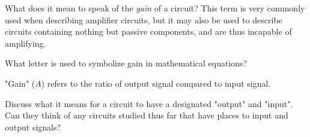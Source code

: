 

What does it mean to speak of the {\it gain} of a circuit?  This term is very commonly used when describing amplifier circuits, but it may also be used to describe circuits containing nothing but passive components, and are thus incapable of amplifying.

What letter is used to symbolize gain in mathematical equations?







"Gain" ($A$) refers to the ratio of output signal compared to input signal.







Discuss what it means for a circuit to have a designated "output" and "input".  Can they think of any circuits studied thus far that have places to input and output signals?




